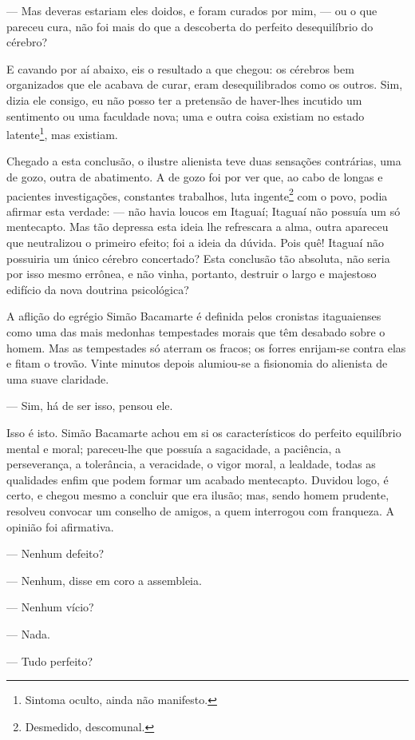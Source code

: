 --- Mas deveras estariam eles doidos, e foram curados por mim, --- ou o
que pareceu cura, não foi mais do que a descoberta do perfeito
desequilíbrio do cérebro?

E cavando por aí abaixo, eis o resultado a que chegou: os cérebros bem
organizados que ele acabava de curar, eram desequilibrados como os
outros. Sim, dizia ele consigo, eu não posso ter a pretensão de
haver-lhes incutido um sentimento ou uma faculdade nova; uma e outra
coisa existiam no estado latente\footnote{Sintoma oculto, ainda não
  manifesto.}, mas existiam.

Chegado a esta conclusão, o ilustre alienista teve duas sensações
contrárias, uma de gozo, outra de abatimento. A de gozo foi por ver que,
ao cabo de longas e pacientes investigações, constantes trabalhos, luta
ingente\footnote{Desmedido, descomunal.} com o povo, podia afirmar esta
verdade: --- não havia loucos em Itaguaí; Itaguaí não possuía um só
mentecapto. Mas tão depressa esta ideia lhe refrescara a alma, outra
apareceu que neutralizou o primeiro efeito; foi a ideia da dúvida. Pois
quê! Itaguaí não possuiria um único cérebro concertado? Esta conclusão
tão absoluta, não seria por isso mesmo errônea, e não vinha, portanto,
destruir o largo e majestoso edifício da nova doutrina psicológica?

A aflição do egrégio Simão Bacamarte é definida pelos cronistas
itaguaienses como uma das mais medonhas tempestades morais que têm
desabado sobre o homem. Mas as tempestades só aterram os fracos; os
forres enrijam-se contra elas e fitam o trovão. Vinte minutos depois
alumiou-se a fisionomia do alienista de uma suave claridade.

--- Sim, há de ser isso, pensou ele.

Isso é isto. Simão Bacamarte achou em si os característicos do perfeito
equilíbrio mental e moral; pareceu-lhe que possuía a sagacidade, a
paciência, a perseverança, a tolerância, a veracidade, o vigor moral, a
lealdade, todas as qualidades enfim que podem formar um acabado
mentecapto. Duvidou logo, é certo, e chegou mesmo a concluir que era
ilusão; mas, sendo homem prudente, resolveu convocar um conselho de
amigos, a quem interrogou com franqueza. A opinião foi afirmativa.

--- Nenhum defeito?

--- Nenhum, disse em coro a assembleia.

--- Nenhum vício?

--- Nada.

--- Tudo perfeito?

